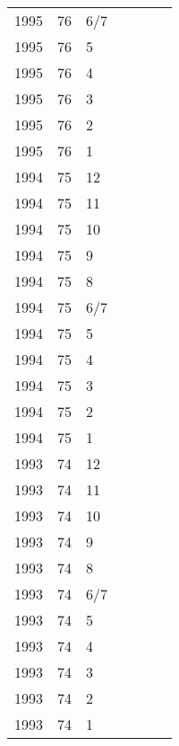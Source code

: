 \begin{longtable}{ |l|l|l|l|p{2.7cm}|l|p{2cm}| }
 1995 & 76 &   6/7 &         &                &  & \\
 1995 & 76 &     5 &         &                &  & \\
 1995 & 76 &     4 &         &                &  & \\
 1995 & 76 &     3 &         &                &  & \\
 1995 & 76 &     2 &         &                &  & \\
 1995 & 76 &     1 &         &                &  & \\
 1994 & 75 &    12 &         &                &  & \\
 1994 & 75 &    11 &         &                &  & \\
 1994 & 75 &    10 &         &                &  & \\
 1994 & 75 &     9 &         &                &  & \\
 1994 & 75 &     8 &         &                &  & \\
 1994 & 75 &   6/7 &         &                &  & \\
 1994 & 75 &     5 &         &                &   & \\
 1994 & 75 &     4 &         &                &  & \\
 1994 & 75 &     3 &         &                &  & \\
 1994 & 75 &     2 &         &                &  & \\
 1994 & 75 &     1 &         &                &  & \\
 1993 & 74 &    12 &         &                &  & \\
 1993 & 74 &    11 &         &                &  & \\
 1993 & 74 &    10 &         &                &  & \\
 1993 & 74 &     9 &         &                &  & \\
 1993 & 74 &     8 &         &                &  & \\
 1993 & 74 &   6/7 &         &                &  & \\
 1993 & 74 &     5 &         &                &  & \\
 1993 & 74 &     4 &         &                &  & \\
 1993 & 74 &     3 &         &                &  & \\
 1993 & 74 &     2 &         &                &  & \\
 1993 & 74 &     1 &         &                &  & \\

\end{longtable}
